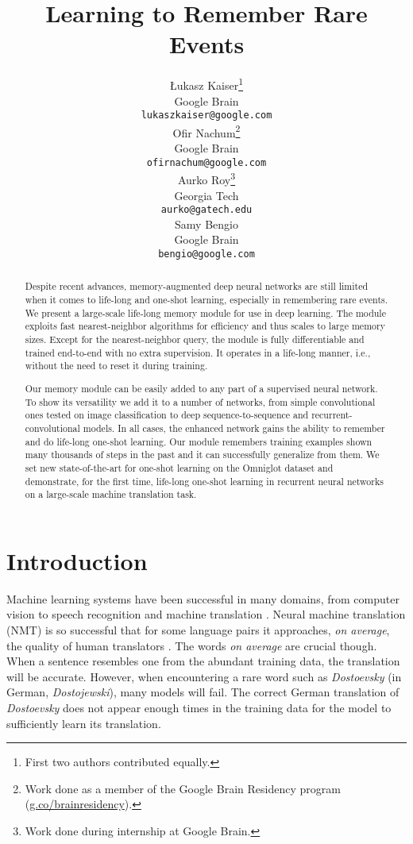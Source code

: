 \documentclass{article} \usepackage{iclr2017_conference,times}
\title{Learning to Remember Rare Events}
\author{\L{}ukasz Kaiser\thanks{First two authors contributed equally.} \\
  Google Brain\\
  \texttt{lukaszkaiser@google.com} \\
\And
  Ofir Nachum\thanks{Work done as a member of the Google Brain Residency program (\url{g.co/brainresidency}).} \\
  Google Brain\\
  \texttt{ofirnachum@google.com} \\
\And
  Aurko Roy\thanks{Work done during internship at Google Brain.} \\
  Georgia Tech \\
  \texttt{aurko@gatech.edu} \\
\And
  Samy Bengio \\
  Google Brain \\
  \texttt{bengio@google.com} \\
}
\begin{document}
\maketitle

\begin{abstract}
Despite recent advances, memory-augmented deep neural networks are still limited
when it comes to life-long and one-shot learning, especially in remembering rare events.
We present a large-scale life-long memory module for use in deep learning.
The module exploits fast nearest-neighbor algorithms for efficiency and
thus scales to large memory sizes.
Except for the nearest-neighbor query, the module is fully differentiable
and trained end-to-end with no extra supervision.  It operates in
a life-long manner, i.e., without the need to reset it during training.

Our memory module can be easily added to any part of a supervised neural network.
To show its versatility we add it to a number of networks, from simple
convolutional ones tested on image classification to deep sequence-to-sequence
and recurrent-convolutional models.
In all cases, the enhanced network gains the ability to remember
and do life-long one-shot learning.
Our module remembers training examples shown many thousands
of steps in the past and it can successfully generalize from them.
We set new state-of-the-art for one-shot learning on the Omniglot dataset
and demonstrate, for the first time, life-long one-shot learning in
recurrent neural networks on a large-scale machine translation task.
\end{abstract}

\section{Introduction}

Machine learning systems have been successful in many domains, from computer vision \citep{img12} to
speech recognition \citep{speech-nn} and machine translation \citep{sutskever14,bahdanau2014neural,cho2014learning}.
Neural machine translation (NMT) is so successful that for some language pairs it approaches,
\emph{on average}, the quality of human translators \citep{gnmt}.
The words \emph{on average} are crucial though. When a sentence resembles
one from the abundant training data, the translation will be accurate.
However, when encountering a rare word such as \emph{Dostoevsky} (in German,
\emph{Dostojewski}), many models will fail.
The correct German translation of \emph{Dostoevsky} does not appear enough times 
in the training data for the model to sufficiently learn its translation.
\end{document}
